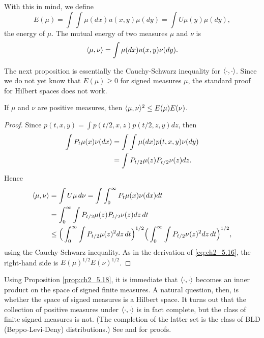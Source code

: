 With this in mind, we define
\begin{equation}\label{eq:ch2_5.14}
    E(\mu) = \int\int\mu(dx)u(x,y)\mu(dy) = \int U\mu(y)\mu(dy),
\end{equation}
the energy of $\mu$. The mutual energy of two measures $\mu$ and $\nu$ is
\begin{equation}\label{eq:ch2_5.15}
    \langle \mu,\nu \rangle = \int\mu(dx)u(x,y)\nu(dy).
\end{equation}

The next proposition is essentially the Cauchy-Schwarz inequality for $\langle \cdot,\cdot \rangle$. Since we do not yet know that $E(\mu) \geq 0$ for signed measures $\mu$, the standard proof for Hilbert spaces does not work.

\begin{proposition}\label{prop:ch2_5.18}
If $\mu$ and $\nu$ are positive measures, then $\langle \mu,\nu \rangle^2 \leq E(\mu)E(\nu)$.
\end{proposition}

\begin{proof}
Since $p(t,x,y) = \int p(t/2,x,z)p(t/2,z,y)dz$, then
\begin{align}\label{eq:ch2_5.16}
    \int P_t\mu(x)\nu(dx) &= \int\int\mu(dx)p(t,x,y)\nu(dy) \\
    &= \int P_{t/2}\mu(z)P_{t/2}\nu(z)dz. \notag
\end{align}
Hence
\begin{align*}
    \langle \mu,\nu \rangle &= \int U\mu \, d\nu = \int\int_0^\infty P_t\mu(x)\nu(dx)dt \\
    &= \int_0^\infty\int P_{t/2}\mu(z)P_{t/2}\nu(z) dz \, dt \\
    &\leq \Big(\int_0^\infty\int P_{t/2}\mu(z)^2 dz \, dt\Big)^{1/2}\Big(\int_0^\infty\int P_{t/2}\nu(z)^2 dz \, dt\Big)^{1/2},
\end{align*}
using the Cauchy-Schwarz inequality. As in the derivation of \eqref{eq:ch2_5.16}, the right-hand side is $E(\mu)^{1/2}E(\nu)^{1/2}$.
\end{proof}

Using Proposition \ref{prop:ch2_5.18}, it is immediate that $\langle \cdot,\cdot \rangle$ becomes an inner product on the space of signed finite measures. A natural question, then, is whether the space of signed measures is a Hilbert space. It turns out that the collection of positive measures under $\langle \cdot,\cdot \rangle$ is in fact complete, but the class of finite signed measures is not. (The completion of the latter set is the class of BLD (Beppo-Levi-Deny) distributions.) See \cite{PortStone1978} and \cite{Cartan1945} for proofs.

